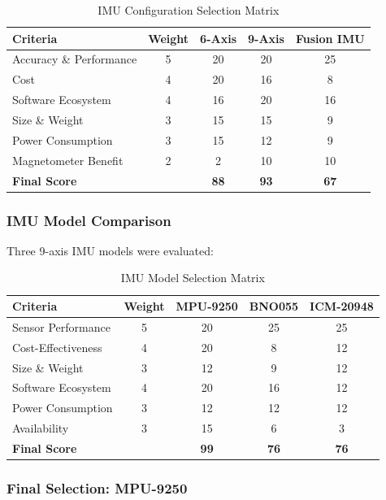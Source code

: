 \begin{table}[H]
\centering
\caption{IMU Configuration Selection Matrix}
\label{tab:imu_config}
\begin{tabular}{|l|c|c|c|c|}
\hline
\textbf{Criteria} & \textbf{Weight} & \textbf{6-Axis} & \textbf{9-Axis} & \textbf{Fusion IMU} \\
\hline
Accuracy \& Performance & 5 & 20 & 20 & 25 \\
\hline
Cost & 4 & 20 & 16 & 8 \\
\hline
Software Ecosystem & 4 & 16 & 20 & 16 \\
\hline
Size \& Weight & 3 & 15 & 15 & 9 \\
\hline
Power Consumption & 3 & 15 & 12 & 9 \\
\hline
Magnetometer Benefit & 2 & 2 & 10 & 10 \\
\hline
\textbf{Final Score} & & \textbf{88} & \textbf{93} & \textbf{67} \\
\hline
\end{tabular}
\end{table}

\subsubsection{IMU Model Comparison}

Three 9-axis IMU models were evaluated:

\begin{table}[H]
\centering
\caption{IMU Model Selection Matrix}
\label{tab:imu_model}
\begin{tabular}{|l|c|c|c|c|}
\hline
\textbf{Criteria} & \textbf{Weight} & \textbf{MPU-9250} & \textbf{BNO055} & \textbf{ICM-20948} \\
\hline
Sensor Performance & 5 & 20 & 25 & 25 \\
\hline
Cost-Effectiveness & 4 & 20 & 8 & 12 \\
\hline
Size \& Weight & 3 & 12 & 9 & 12 \\
\hline
Software Ecosystem & 4 & 20 & 16 & 12 \\
\hline
Power Consumption & 3 & 12 & 12 & 12 \\
\hline
Availability & 3 & 15 & 6 & 3 \\
\hline
\textbf{Final Score} & & \textbf{99} & \textbf{76} & \textbf{76} \\
\hline
\end{tabular}
\end{table}

\subsubsection{Final Selection: MPU-9250}

